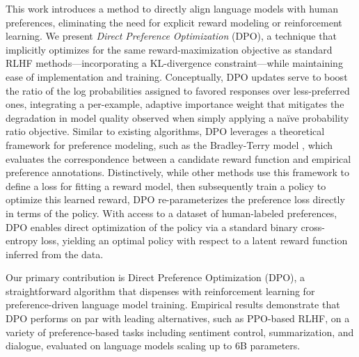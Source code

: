 This work introduces a method to directly align language models with human preferences, eliminating the need for explicit reward modeling or reinforcement learning. We present \textit{Direct Preference Optimization} (DPO), a technique that implicitly optimizes for the same reward-maximization objective as standard RLHF methods—incorporating a KL-divergence constraint—while maintaining ease of implementation and training. Conceptually, DPO updates serve to boost the ratio of the log probabilities assigned to favored responses over less-preferred ones, integrating a per-example, adaptive importance weight that mitigates the degradation in model quality observed when simply applying a naïve probability ratio objective. Similar to existing algorithms, DPO leverages a theoretical framework for preference modeling, such as the Bradley-Terry model \cite{bradley1952rankanalysis}, which evaluates the correspondence between a candidate reward function and empirical preference annotations. Distinctively, while other methods use this framework to define a loss for fitting a reward model, then subsequently train a policy to optimize this learned reward, DPO re-parameterizes the preference loss directly in terms of the policy. With access to a dataset of human-labeled preferences, DPO enables direct optimization of the policy via a standard binary cross-entropy loss, yielding an optimal policy with respect to a latent reward function inferred from the data.

Our primary contribution is Direct Preference Optimization (DPO), a straightforward algorithm that dispenses with reinforcement learning for preference-driven language model training. Empirical results demonstrate that DPO performs on par with leading alternatives, such as PPO-based RLHF, on a variety of preference-based tasks including sentiment control, summarization, and dialogue, evaluated on language models scaling up to 6B parameters.

